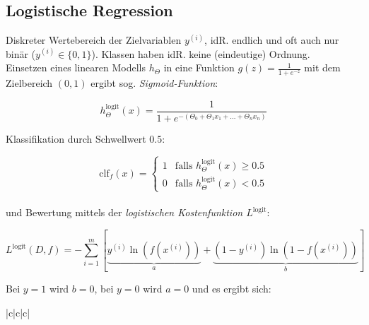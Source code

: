 \subsection{Logistische Regression}
\label{LogRegression}
Diskreter Wertebereich der Zielvariablen $y^{(i)}$, idR. endlich und oft auch nur binär ($y^{(i)} \in \{0,1\}$). Klassen haben idR. keine (eindeutige) Ordnung.\\

Einsetzen eines linearen Modells $h_\Theta$ in eine Funktion $g(z)=\frac{1}{1+e^{-z}}$ mit dem Zielbereich $(0,1)$  ergibt sog. \emph{Sigmoid-Funktion}:

\begin{equation*}
    h_\Theta^{\text{logit}}(x) = \frac{1}{1+e^{-(\Theta_0 + \Theta_1x_1 + \dots + \Theta_nx_n)}}
\end{equation*}

Klassifikation durch Schwellwert $0.5$:

\begin{equation*}
    \text{clf}_f(x) = \left\{
        \begin{array}{ll}
            1 & \text{falls } h_\Theta^{\text{logit}}(x) \geq 0.5\\
            0 & \text{falls } h_\Theta^{\text{logit}}(x) < 0.5
        \end{array}
    \right.
\end{equation*}\\

und Bewertung mittels der \emph{logistischen Kostenfunktion $L^\text{logit}$}:

\begin{equation*}
    L^\text{logit}(D, f) = -\sum_{i=1}^{m}\left[\underset{a}{\underbrace{y^{(i)}\ln(f(x^{(i)}))}} + \underset{b}{\underbrace{(1-y^{(i)})\ln(1-f(x^{(i)}))}}\right]
\end{equation*}

Bei $y=1$ wird $b = 0$, bei $y=0$ wird $a=0$ und es ergibt sich:\\

\begin{tabular*}{|c|c|c|}

\end{tabular*}